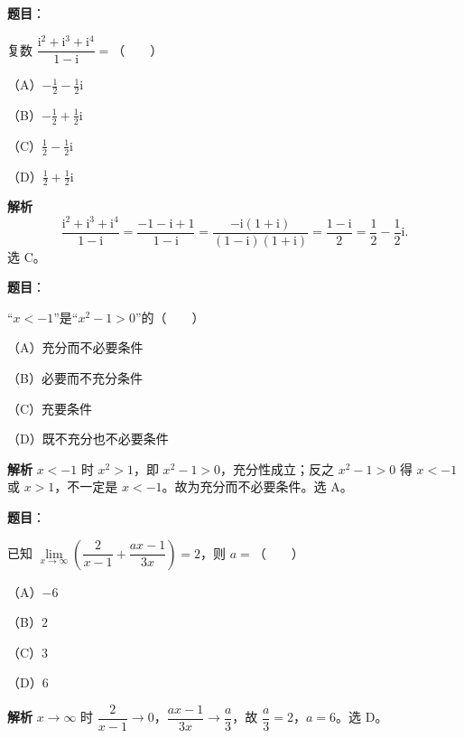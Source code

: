 
\begin{answer}

\textbf{题目}：

复数 $\dfrac{\mathrm i^2+\mathrm i^3+\mathrm i^4}{1-\mathrm i}=$\mbox{（　　）}

（A）$-\frac12-\frac12\mathrm i$

（B）$-\frac12+\frac12\mathrm i$

（C）$\frac12-\frac12\mathrm i$

（D）$\frac12+\frac12\mathrm i$

\textbf{解析}
\nopagebreak[4]
\[\frac{\mathrm i^2+\mathrm i^3+\mathrm i^4}{1-\mathrm i}=\frac{-1-\mathrm i+1}{1-\mathrm i}=\frac{-\mathrm i(1+\mathrm i)}{(1-\mathrm i)(1+\mathrm i)}=\frac{1-\mathrm i}{2}=\frac12-\frac12\mathrm i.\]
选 C。


\end{answer}
\begin{answer}

\textbf{题目}：

“$x<-1$”是“$x^2-1>0$”的\mbox{（　　）}

（A）充分而不必要条件

（B）必要而不充分条件

（C）充要条件

（D）既不充分也不必要条件

\textbf{解析}
$x<-1$ 时 $x^2>1$，即 $x^2-1>0$，充分性成立；反之 $x^2-1>0$ 得 $x<-1$ 或 $x>1$，不一定是 $x<-1$。故为充分而不必要条件。选 A。


\end{answer}
\begin{answer}

\textbf{题目}：

已知 $\lim\limits_{x\to\infty}\left(\dfrac2{x-1}+\dfrac{ax-1}{3x}\right)=2$，则 $a=$\mbox{（　　）}

（A）$-6$

（B）$2$

（C）$3$

（D）$6$

\textbf{解析}
$x\to\infty$ 时 $\dfrac2{x-1}\to0$，$\dfrac{ax-1}{3x}\to\dfrac a3$，故 $\dfrac a3=2$，$a=6$。选 D。


\end{answer}
